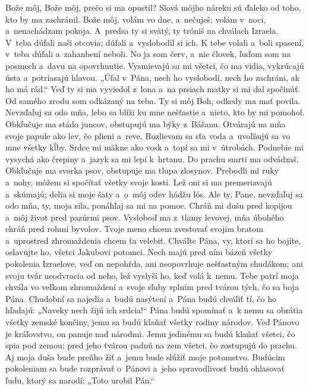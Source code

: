 Bože môj, Bože môj, prečo si ma opustil?
Slová môjho náreku sú ďaleko od toho,
kto by ma zachránil.
\versseparator
Bože môj, volám vo dne, a~nečuješ;
volám v~noci, a~nenachádzam pokoja.
\versseparator
A~predsa ty si svätý,
ty tróniš na chválach Izraela.
\versseparator
V~teba dúfali naši otcovia;
dúfali a~vyslobodil si ich.
\versseparator
K tebe volali a~boli spasení,
v~teba dúfali a~zahanbení neboli.
\versseparator
No ja som červ, a~nie človek,
ľuďom som na posmech a~davu na opovrhnutie.
\versseparator
Vysmievajú sa mi všetci, čo ma vidia,
vykrúcajú ústa a~potriasajú hlavou.
\versseparator
„Úfal v~Pána, nech ho vyslobodí,
nech ho zachráni, ak ho má rád.“
\versseparator
Veď ty si ma vyviedol z~lona
a~na prsiach matky si mi dal spočinúť.
Od samého zrodu som odkázaný na teba.
\versseparator
Ty si môj Boh, odkedy ma mať povila.
Nevzďaľuj sa odo mňa,
\versseparator
lebo sa blíži ku mne nešťastie
a~nieto, kto by mi pomohol.
\versseparator
Obkľučuje ma stádo juncov,
obstupujú ma býky z~Bášanu.
\versseparator
Otvárajú na mňa svoje papule
ako lev, čo plieni a~reve.
\versseparator
Rozlievam sa sťa voda
a~uvoľňujú sa vo mne všetky kĺby.
\versseparator
Srdce mi mäkne ako vosk
a~topí sa mi v~útrobách.
\versseparator
Podnebie mi vysychá ako črepiny
a~jazyk sa mi lepí k~hrtanu.
Do prachu smrti ma odvádzaš.
\versseparator
Obkľučuje ma svorka psov,
obstupuje ma tlupa zlosynov.
\versseparator
Prebodli mi ruky a~nohy,
môžem si spočítať všetky svoje kosti.
\versseparator
Lež oni si ma premeriavajú a~skúmajú;
delia si moje šaty
a~o~môj odev hádžu lós.
\versseparator
Ale ty, Pane, nevzďaľuj sa odo mňa,
ty, moja sila, ponáhľaj sa mi na pomoc.
\versseparator
Chráň mi dušu pred kopijou
a~môj život pred pazúrmi psov.
\versseparator
Vysloboď ma z~tlamy levovej,
mňa úbohého chráň pred rohmi byvolov.
\versseparator
Tvoje meno chcem zvestovať svojim bratom
a~uprostred zhromaždenia chcem ťa velebiť.
\versseparator
Chváľte Pána, vy, ktorí sa ho bojíte,
oslavujte ho, všetci Jakubovi potomci.
\versseparator
Nech majú pred ním bázeň všetky pokolenia Izraelove,
veď on nepohŕda, ani neopovrhuje nešťastným chudákom;
\versseparator
ani svoju tvár neodvracia od neho,
lež vyslyší ho, keď volá k~nemu.
\versseparator
Tebe patrí moja chvála vo veľkom zhromaždení
a~svoje sľuby splním pred tvárou tých, čo sa boja Pána.
\versseparator
Chudobní sa najedia a~budú nasýtení
a~Pána budú chváliť tí, čo ho hľadajú:
„Naveky nech žijú ich srdcia!“
\versseparator
Pána budú spomínať a~k nemu sa obrátia
všetky zemské končiny,
\versseparator
jemu sa budú klaňať
všetky rodiny národov.
\versseparator
Veď Pánovo je kráľovstvo,
on panuje nad národmi.
\versseparator
Jemu jedinému sa budú klaňať všetci, čo spia pod zemou;
pred jeho tvárou padnú na zem všetci, čo zostupujú do prachu.
\versseparator
Aj moja duša bude preňho žiť
a~jemu bude slúžiť moje potomstvo.
\versseparator
Budúcim pokoleniam sa bude rozprávať o~Pánovi
a~jeho spravodlivosť budú ohlasovať ľudu, ktorý sa narodí:
„Toto urobil Pán.“ 
